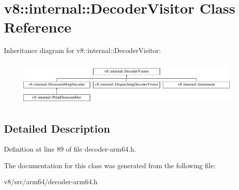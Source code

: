 \hypertarget{classv8_1_1internal_1_1DecoderVisitor}{}\section{v8\+:\+:internal\+:\+:Decoder\+Visitor Class Reference}
\label{classv8_1_1internal_1_1DecoderVisitor}
Inheritance diagram for v8\+:\+:internal\+:\+:Decoder\+Visitor\+:\begin{figure}[H]
\begin{center}
\leavevmode
\includegraphics[height=2.343096cm]{classv8_1_1internal_1_1DecoderVisitor}
\end{center}
\end{figure}


\subsection{Detailed Description}


Definition at line 89 of file decoder-\/arm64.\+h.



The documentation for this class was generated from the following file\+:\begin{DoxyCompactItemize}
\item 
v8/src/arm64/decoder-\/arm64.\+h\end{DoxyCompactItemize}

